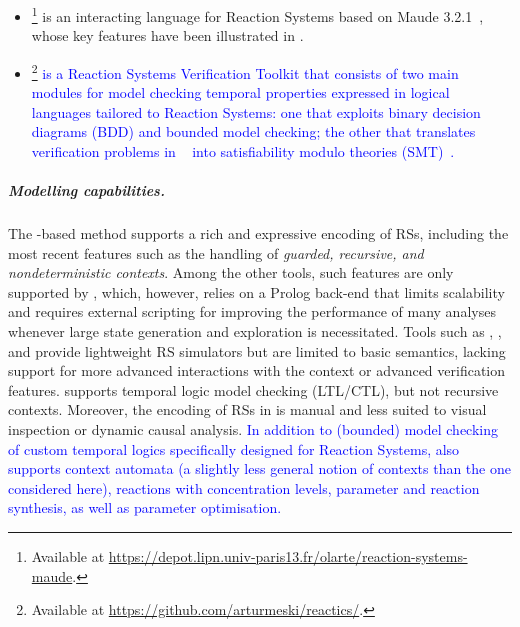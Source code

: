 \begin{itemize}
\item
\ccReact\footnote{Available at \url{https://depot.lipn.univ-paris13.fr/olarte/reaction-systems-maude}.} is an interacting language for Reaction Systems based on Maude 3.2.1~\cite{DBLP:conf/cmsb/BallisBFO24}, whose key features have been illustrated in .
\item
\textcolor{blue}{
\ReactICS\footnote{Available at \url{https://github.com/arturmeski/reactics/}.} is a Reaction Systems Verification Toolkit that consists of two main modules for model checking temporal properties expressed in logical languages tailored to Reaction Systems:
one that exploits binary decision diagrams (BDD) and bounded model checking;
the other that translates verification problems in \rsLTL~\cite{DBLP:journals/isci/MeskiPR15}  into satisfiability modulo theories (SMT)~\cite{DBLP:journals/nc/MeskiKMP24}.
}
\end{itemize}

\subparagraph*{Modelling capabilities.}
The \GROOVE-based method supports a rich and expressive encoding of RSs, including the most recent features such as the handling of \emph{guarded, recursive, and nondeterministic contexts}.
Among the other tools, such features are only supported by \BioResolve, which, however, relies on a Prolog back-end that limits scalability and requires external scripting for improving the performance of many analyses whenever large state generation and exploration is necessitated. Tools such as \HERESY, \WebRSim, and \clrs provide lightweight RS simulators but are limited to basic semantics, lacking support for more advanced interactions with the context or advanced verification features. \ccReact supports temporal logic model checking (LTL/CTL), but not recursive contexts. Moreover, the encoding of RSs in \ccReact is manual and less suited to visual inspection or dynamic causal analysis.
\textcolor{blue}{
In addition to (bounded) model checking of custom temporal logics specifically designed for Reaction Systems, \ReactICS also supports context automata (a slightly less general notion of contexts than the one considered here), reactions with concentration levels, parameter and reaction synthesis, as well as parameter optimisation. 
} 

